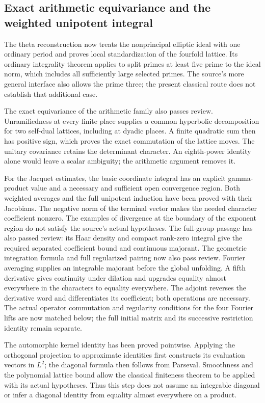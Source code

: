 \documentclass[11pt,a4paper]{article}
\theoremstyle{remark}
\begin{document}
\subsection{Exact arithmetic equivariance and the weighted unipotent integral}

The theta reconstruction now treats the nonprincipal elliptic
ideal with one ordinary period and proves local standardization
of the fourfold lattice. Its ordinary integrality theorem applies
to split primes at least five prime to the ideal norm, which
includes all sufficiently large selected primes. The source's
more general interface also allows the prime three; the present
classical route does not establish that additional case.

The exact equivariance of the arithmetic family also passes
review. Unramifiedness at every finite place supplies a common
hyperbolic decomposition for two self-dual lattices, including
at dyadic places. A finite quadratic sum then has positive sign,
which proves the exact commutation of the lattice moves.
The unitary covariance retains the determinant character.
An eighth-power identity alone would leave a scalar ambiguity;
the arithmetic argument removes it.

For the Jacquet estimates, the basic coordinate integral has
an explicit gamma-product value and a necessary and sufficient
open convergence region. Both weighted averages and the full
unipotent induction have been proved with their Jacobians.
The negative norm of the terminal vector makes the needed
character coefficient nonzero. The examples of divergence
at the boundary of the exponent region do not satisfy the
source's actual hypotheses. The full-group passage has also passed
review: its Haar density and compact rank-zero integral give the
required separated coefficient bound and continuous majorant.
The geometric integration formula and full regularized pairing now
also pass review. Fourier averaging supplies an integrable majorant
before the global unfolding. A fifth derivative gives continuity under
dilation and upgrades equality almost everywhere in the characters to
equality everywhere. The adjoint reverses the derivative word and
differentiates its coefficient; both operations are necessary. The
actual operator commutation and regularity conditions for the four
Fourier lifts are now matched below; the full initial matrix and its
successive restriction identity remain separate.

The automorphic kernel identity has been proved pointwise. Applying
the orthogonal projection to approximate identities first constructs
its evaluation vectors in $L^2$; the diagonal formula then follows
from Parseval. Smoothness and the polynomial lattice bound allow
the classical finiteness theorem to be applied with its actual
hypotheses\cite{getz-hahn-2022}. Thus this step does not assume an
integrable diagonal or infer a diagonal identity from equality almost
everywhere on a product.
\end{document}
